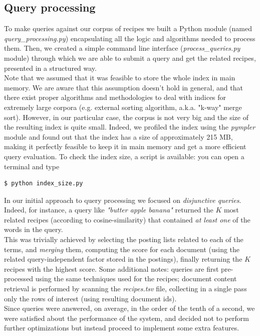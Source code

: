 \subsection{Query processing}

To make queries against our corpus of recipes we built a Python module (named \textit{query\_processing.py}) encapsulating all the logic and algorithms needed to process them. Then, we created a simple command line interface (\textit{process\_queries.py} module) through which we are able to submit a query and get the related recipes, presented in a structured way.\\
Note that we assumed that it was feasible to store the whole index in main memory. We are aware that this assumption doesn't hold in general, and that there exist proper algorithms and methodologies to deal with indices for extremely large corpora (e.g. external sorting algorithm, a.k.a. "k-way" merge sort). However, in our particular case, the corpus is not very big and the size of the resulting index is quite small. Indeed, we profiled the index using the \textit{pympler}\cite{pympler} module and found out that the index has a size of approximately 215 MB, making it perfectly feasible to keep it in main memory and get a more efficient query evaluation. To check the index size, a script is available: you can open a terminal and type
\begin{lstlisting}
$ python index_size.py
\end{lstlisting}
In our initial approach to query processing we focused on \textit{disjunctive queries}. Indeed, for instance, a query like \textit{"butter apple banana"} returned the $K$ most related recipes (according to cosine-similarity) that contained \textit{at least one} of the words in the query. \\
This was trivially achieved by selecting the posting lists related to each of the terms, and \textit{merging} them, computing the score for each document (using the related query-independent factor stored in the postings), finally returning the $K$ recipes with the highest score. Some additional notes: queries are first pre-processed using the same techniques used for the recipes; document content retrieval is performed by scanning the \textit{recipes.tsv} file, collecting in a single pass only the rows of interest (using resulting document ids).\\
Since queries were answered, on average, in the order of the tenth of a second, we were satisfied about the performance of the system, and decided not to perform further optimizations but instead proceed to implement some extra features.


